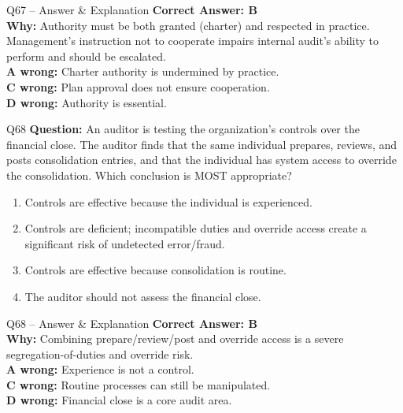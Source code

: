 \documentclass[aspectratio=169,10pt]{beamer}
\begin{document}
	\begin{frame}[t]{Q67 -- Answer \& Explanation}
		\small
		\textbf{Correct Answer: B} \\[4pt]
		\textbf{Why:} Authority must be both granted (charter) and respected in practice. Management's instruction not to cooperate impairs internal audit's ability to perform and should be escalated. \\[4pt]
		\textbf{A wrong:} Charter authority is undermined by practice. \\[2pt]
		\textbf{C wrong:} Plan approval does not ensure cooperation. \\[2pt]
		\textbf{D wrong:} Authority is essential.
	\end{frame}
	
	\begin{frame}[t]{Q68}
		\small
		\textbf{Question:} An auditor is testing the organization's controls over the financial close. The auditor finds that the same individual prepares, reviews, and posts consolidation entries, and that the individual has system access to override the consolidation. Which conclusion is MOST appropriate?
		\begin{enumerate}[label=\Alph*.,itemsep=1pt,topsep=2pt]
			\item Controls are effective because the individual is experienced.
			\item Controls are deficient; incompatible duties and override access create a significant risk of undetected error/fraud.
			\item Controls are effective because consolidation is routine.
			\item The auditor should not assess the financial close.
		\end{enumerate}
	\end{frame}
	
	\begin{frame}[t]{Q68 -- Answer \& Explanation}
		\small
		\textbf{Correct Answer: B} \\[4pt]
		\textbf{Why:} Combining prepare/review/post and override access is a severe segregation-of-duties and override risk. \\[4pt]
		\textbf{A wrong:} Experience is not a control. \\[2pt]
		\textbf{C wrong:} Routine processes can still be manipulated. \\[2pt]
		\textbf{D wrong:} Financial close is a core audit area.
	\end{frame}
	
\end{document}
